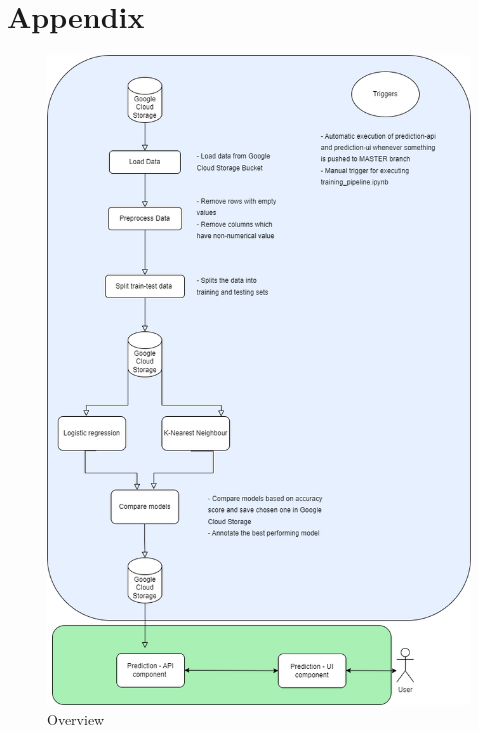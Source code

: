 \documentclass[10pt, letterpaper]{report}       %
\begin{document}
\chapter{Appendix}
\begin{figure}
\begin{center}
    \caption{Overview}
    \label{overview}
    \includegraphics[scale=0.45]{Fig/overview.png}
    \end{center}
\end{figure}
\end{document}
